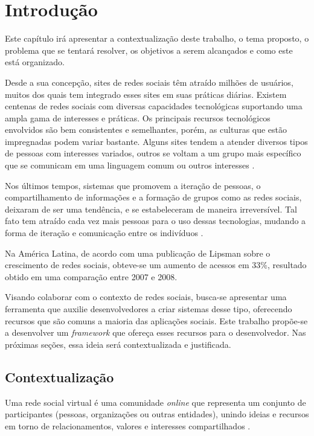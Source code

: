 \chapter[Introdução]{Introdução}

Este capítulo irá apresentar a contextualização deste trabalho, o tema proposto, o problema que se tentará resolver, os objetivos a serem alcançados e como este está organizado.

Desde a sua concepção, sites de redes sociais têm atraído milhões de usuários, muitos dos quais tem integrado esses sites em suas práticas diárias. Existem centenas de redes sociais com diversas capacidades tecnológicas suportando uma ampla gama de interesses e práticas. Os principais recursos tecnológicos envolvidos são bem consistentes e semelhantes, porém, as culturas que estão impregnadas podem variar bastante. Alguns sites tendem a atender diversos tipos de pessoas com interesses variados, outros se voltam a um grupo mais específico que se comunicam em uma linguagem comum ou outros interesses \cite{Boyd:Ellison:2007}.

Nos últimos tempos, sistemas que promovem a iteração de pessoas, o compartilhamento de informações e a formação de grupos como as redes sociais, deixaram de ser uma tendência, e se estabeleceram de maneira irreversível. Tal fato tem atraído cada vez mais pessoas para o uso dessas tecnologias, mudando a forma de iteração e comunicação entre os indivíduos \cite{Santana:Melo-Solarte:Neris:Miranda:Baranauskas:2009}.

Na América Latina, de acordo com uma publicação de Lipsman \cite{Lipsman:2008} sobre o crescimento de redes sociais, obteve-se um aumento de acessos em 33\%, resultado obtido em uma comparação entre 2007 e 2008.

Visando colaborar com o contexto de redes sociais, busca-se apresentar uma ferramenta que auxilie desenvolvedores a criar sistemas desse tipo, oferecendo recursos que são comuns a maioria das aplicações sociais. Este trabalho propõe-se a desenvolver um \textit{framework} que ofereça esses recursos para o desenvolvedor. Nas próximas seções, essa ideia será contextualizada e justificada.

\section{Contextualização}

Uma rede social virtual é uma comunidade \textit{online} que representa um conjunto de participantes (pessoas, organizações ou outras entidades), unindo ideias e recursos em torno de relacionamentos, valores e interesses compartilhados \cite{Marteleto:2001}.

